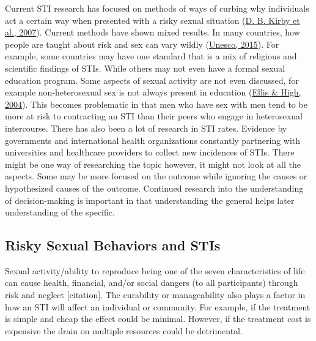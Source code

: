 \documentclass[
  donotrepeattitle,doc, 12pt, a4paper,floatsintext]{apa7}
\begin{document}
Current STI research has focused on methods of ways of curbing why individuals act a certain way when presented with a risky sexual situation (\protect\hyperlink{ref-kirby2007}{D. B. Kirby et al., 2007}). Current methods have shown mixed results. In many countries, how people are taught about risk and sex can vary wildly (\protect\hyperlink{ref-unesco2015}{Unesco, 2015}). For example, some countries may have one standard that is a mix of religious and scientific findings of STIs. While others may not even have a formal sexual education program. Some aspects of sexual activity are not even discussed, for example non-heterosexual sex is not always present in education (\protect\hyperlink{ref-ellis2004}{Ellis \& High, 2004}). This becomes problematic in that men who have sex with men tend to be more at risk to contracting an STI than their peers who engage in heterosexual intercourse. There has also been a lot of research in STI rates. Evidence by governments and international health organizations constantly partnering with universities and healthcare providers to collect new incidences of STIs. There might be one way of researching the topic however, it might not look at all the aspects. Some may be more focused on the outcome while ignoring the causes or hypothesized causes of the outcome. Continued research into the understanding of decision-making is important in that understanding the general helps later understanding of the specific.

\hypertarget{risky-sexual-behaviors-and-stis}{%
\subsection{Risky Sexual Behaviors and STIs}\label{risky-sexual-behaviors-and-stis}}

Sexual activity/ability to reproduce being one of the seven characteristics of life can cause health, financial, and/or social dangers (to all participants) through risk and neglect {[}citation{]}. The curability or manageability also plays a factor in how an STI will affect an individual or community. For example, if the treatment is simple and cheap the effect could be minimal. However, if the treatment cost is expensive the drain on multiple resources could be detrimental.
\end{document}
